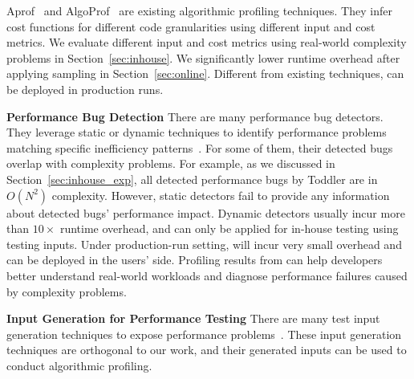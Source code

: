 Aprof~\cite{Aprof1, Aprof2} and AlgoProf~\cite{AlgoProf} are existing 
algorithmic profiling techniques.
They infer cost functions for different code granularities 
using different input and cost metrics.
We evaluate different input and cost metrics 
using real-world complexity problems in Section~\ref{sec:inhouse}.
We significantly lower runtime overhead after applying sampling in Section~\ref{sec:online}.
Different from existing techniques, \Tool can be deployed in production runs. 

\noindent\textbf{Performance Bug Detection}
There are many performance bug detectors.
They leverage static or dynamic techniques to 
identify performance problems matching specific inefficiency 
patterns~\cite{yufei-perf,CLARITY,xiao13:context,PerfBug,Alabama,CARAMEL,XuDataStructure,XuBloatPLDI2009,XuBloatPLDI2010,Cachetor,LoopInvariant,falsesharing}.
For some of them, their detected bugs overlap with complexity problems. 
For example, as we discussed in Section~\ref{sec:inhouse_exp},
all detected performance bugs by Toddler are in $O(N^2)$ complexity. 
However, static detectors fail to provide any information 
about detected bugs' performance impact.
Dynamic detectors usually incur more than $10\times$ runtime overhead,
and can only be applied for in-house testing using testing inputs. 
Under production-run setting, 
\Tool will incur very small overhead and can be deployed in the users' side. 
Profiling results from \Tool can help developers better
understand real-world workloads and diagnose performance failures caused by complexity problems. 


\noindent\textbf{Input Generation for Performance Testing}
There are many test input generation techniques to expose performance problems~\cite{WISE,EventBreak,slowfuzz}.
These input generation techniques are orthogonal to our work, 
and their generated inputs can be used to conduct algorithmic profiling. 
